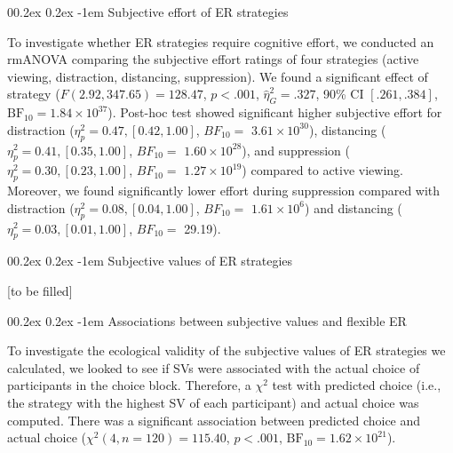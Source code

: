 \documentclass[
  man,floatsintext]{apa6}
\makeatletter
\let\oldparagraph\paragraph
\renewcommand{\paragraph}[1]{\oldparagraph{#1}\mbox{}}
\renewcommand{\paragraph}{\@startsection{paragraph}{4}{\parindent}%
  {0\baselineskip \@plus 0.2ex \@minus 0.2ex}%
  {-1em}%
  {\normalfont\normalsize\bfseries\itshape\typesectitle}}
\makeatother
\begin{document}
\hypertarget{subjective-effort-of-er-strategies}{%
\paragraph{Subjective effort of ER strategies}\label{subjective-effort-of-er-strategies}}

To investigate whether ER strategies require cognitive effort, we conducted an rmANOVA comparing the subjective effort ratings of four strategies (active viewing, distraction, distancing, suppression).
We found a significant effect of strategy (\(F(2.92, 347.65) = 128.47\), \(p < .001\), \(\hat{\eta}^2_G = .327\), 90\% CI \([.261, .384]\), \(\mathrm{BF}_{\textrm{10}} = 1.84 \times 10^{37}\)).
Post-hoc test showed significant higher subjective effort for distraction (\(\eta_{p}^{2}=0.47, [0.42, 1.00]\), \(BF_{10}=\) \(3.61 \times 10^{30}\)), distancing (\(\eta_{p}^{2}=0.41, [0.35, 1.00]\), \(BF_{10}=\) \(1.60 \times 10^{28}\)), and suppression (\(\eta_{p}^{2}=0.30, [0.23, 1.00]\), \(BF_{10}=\) \(1.27 \times 10^{19}\)) compared to active viewing.
Moreover, we found significantly lower effort during suppression compared with distraction (\(\eta_{p}^{2}=0.08, [0.04, 1.00]\), \(BF_{10}=\) \(1.61 \times 10^{6}\)) and distancing (\(\eta_{p}^{2}=0.03, [0.01, 1.00]\), \(BF_{10}=\) 29.19).

\hypertarget{subjective-values-of-er-strategies}{%
\paragraph{Subjective values of ER strategies}\label{subjective-values-of-er-strategies}}

{[}to be filled{]}

\hypertarget{associations-between-subjective-values-and-flexible-er}{%
\paragraph{Associations between subjective values and flexible ER}\label{associations-between-subjective-values-and-flexible-er}}

To investigate the ecological validity of the subjective values of ER strategies we calculated, we looked to see if SVs were associated with the actual choice of participants in the choice block.
Therefore, a \(\chi^{2}\) test with predicted choice (i.e., the strategy with the highest SV of each participant) and actual choice was computed.
There was a significant association between predicted choice and actual choice (\(\chi^2(4, n = 120) = 115.40\), \(p < .001\), \(\mathrm{BF}_{\textrm{10}} = 1.62 \times 10^{21}\)).
\end{document}

